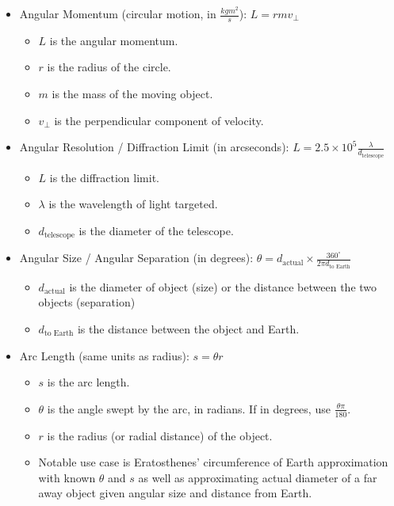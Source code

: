 \documentclass[letterpaper,14pt]{extarticle}
\begin{document}
\begin{itemize}
    \item Angular Momentum (circular motion, in $\frac{kgm^2}{s}$): $L = rmv_{\perp}$
    \begin{itemize}
        \item $L$ is the angular momentum.
        \item $r$ is the radius of the circle.
        \item $m$ is the mass of the moving object.
        \item $v_{\perp}$ is the perpendicular component of velocity.
    \end{itemize}
    \item Angular Resolution / Diffraction Limit (in arcseconds): $L = 2.5 \times 10^5 \frac{\lambda}{d_{\text{telescope}}}$
    \begin{itemize}
        \item $L$ is the diffraction limit.
        \item $\lambda$ is the wavelength of light targeted.
        \item $d_{\text{telescope}}$ is the diameter of the telescope.
    \end{itemize}
    \item Angular Size / Angular Separation (in degrees): $\theta = d_{\text{actual}} \times \frac{360^\circ}{2\pi d_{\text{to Earth}}}$
    \begin{itemize}
        \item $d_{\text{actual}}$ is the diameter of object (size) or the distance between the two objects (separation)
        \item $d_{\text{to Earth}}$ is the distance between the object and Earth.
    \end{itemize}
    \item Arc Length (same units as radius): $s = \theta r$
    \begin{itemize}
        \item $s$ is the arc length.
        \item $\theta$ is the angle swept by the arc, in radians. If in degrees, use $\frac{\theta\pi}{180}$.
        \item $r$ is the radius (or radial distance) of the object.
        \item Notable use case is Eratosthenes' circumference of Earth approximation with known $\theta$ and $s$ as well as approximating actual diameter of a far away object given angular size and distance from Earth.
    \end{itemize}

\end{itemize}
\end{document}
